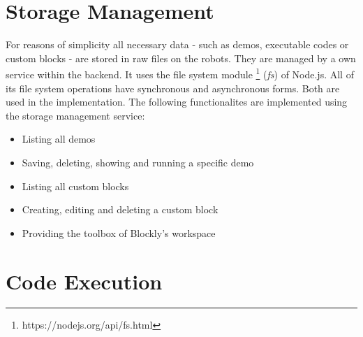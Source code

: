 \begin{figure}[htbp]
	
\end{figure}

\section{Storage Management}
For reasons of simplicity all necessary data - such as demos, executable codes or custom blocks - are stored in raw files on the robots. They are managed by a own service within the backend. It uses the file system module \footnote{https://nodejs.org/api/fs.html} (\textit{fs}) of Node.js. All of its file system operations have synchronous and asynchronous forms. Both are used in the implementation. The following functionalites are implemented using the storage management service:

\begin{itemize}
    \item Listing all demos
    \item Saving, deleting, showing and running a specific demo
    \item Listing all custom blocks
    \item Creating, editing and deleting a custom block
    \item Providing the toolbox of Blockly's workspace
\end{itemize}

\section{Code Execution}
